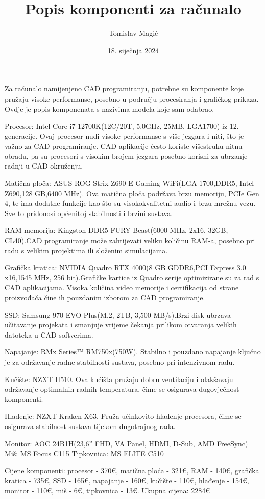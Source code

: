 \documentclass{article}
\title{Popis komponenti za računalo}
\author{Tomislav Magić}
\date{18. siječnja 2024}
\begin{document}
\maketitle
Za računalo namijenjeno CAD programiranju, potrebne su komponente koje pružaju visoke performanse, posebno u području procesiranja i grafičkog prikaza. Ovdje je popis komponenata s nazivima modela koje sam odabrao.

Procesor: Intel Core i7-12700K(12C/20T, 5.0GHz, 25MB, LGA1700) iz 12. generacije. Ovaj procesor nudi visoke performanse s više jezgara i niti, što je važno za CAD programiranje. CAD aplikacije često koriste višestruku nitnu obradu, pa su procesori s visokim brojem jezgara posebno korisni za ubrzanje radnji u CAD okruženju.


Matična ploča: ASUS ROG Strix Z690-E Gaming WiFi(LGA 1700,DDR5,	Intel Z690,128 GB,6400 MHz). Ova matična ploča podržava brzu memoriju, PCIe Gen 4, te ima dodatne funkcije kao što su visokokvalitetni audio i brzu mrežnu vezu. Sve to pridonosi općenitoj stabilnosti i brzini sustava.


RAM memorija: Kingston DDR5 FURY Beast(6000 MHz, 2x16, 32GB, CL40).CAD programiranje može zahtijevati veliku količinu RAM-a, posebno pri radu s velikim projektima ili složenim simulacijama.

Grafička kratica: NVIDIA Quadro RTX 4000(8 GB GDDR6,PCI Express 3.0 x16,1545 MHz, 256 bit).Grafičke kartice iz Quadro serije optimizirane su za rad s CAD aplikacijama. Visoka količina video memorije i certifikacija od strane proizvođača čine ih pouzdanim izborom za CAD programiranje.

SSD: Samsung 970 EVO Plus(M.2, 2TB, 3,500 MB/s).Brzi disk ubrzava učitavanje projekata i smanjuje vrijeme čekanja prilikom otvaranja velikih datoteka u CAD softverima.

Napajanje: RMx Series™ RM750x(750W). Stabilno i pouzdano napajanje ključno je za održavanje radne stabilnosti sustava, posebno pri intenzivnom radu.

Kučište: NZXT H510. Ova kućišta pružaju dobru ventilaciju i olakšavaju održavanje optimalnih radnih temperatura, čime se osigurava dugovječnost komponenti.

Hlađenje: NZXT Kraken X63. Pruža učinkovito hlađenje procesora, čime se osigurava stabilnost sustava tijekom dugotrajnog rada.

Monitor: AOC 24B1H(23,6” FHD, VA Panel, HDMI, D-Sub, AMD FreeSync)
Miš: MS Focus C115
Tipkovnica: MS ELITE C510

Cijene komponenti: procesor - 370€, matična ploća - 321€, RAM - 140€, grafička kratica - 735€, SSD - 165€, napajanje - 160€, kučište - 110€, hlađenje - 154€, monitor - 110€, miš - 6€, tipkovnica - 13€.
Ukupna cijena: 2284€
\end{document}
